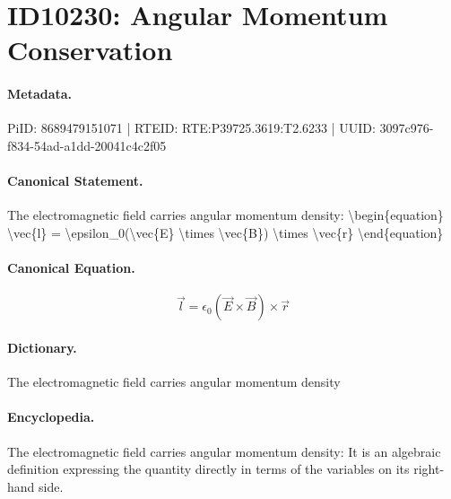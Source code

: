 \section*{ID10230: Angular Momentum Conservation}
\paragraph{Metadata.}
PiID: 8689479151071 | RTEID: RTE:P39725.3619:T2.6233 | UUID: 3097c976-f834-54ad-a1dd-20041c4c2f05

\paragraph{Canonical Statement.}
The electromagnetic field carries angular momentum density: \textbackslash{}begin\{equation\} \textbackslash{}vec\{l\} = \textbackslash{}epsilon\_0(\textbackslash{}vec\{E\} \textbackslash{}times \textbackslash{}vec\{B\}) \textbackslash{}times \textbackslash{}vec\{r\} \textbackslash{}end\{equation\}

\paragraph{Canonical Equation.}
\[
\vec{l} = \epsilon_0(\vec{E} \times \vec{B}) \times \vec{r}
\]

\paragraph{Dictionary.}
The electromagnetic field carries angular momentum density

\paragraph{Encyclopedia.}
The electromagnetic field carries angular momentum density: It is an algebraic definition expressing the quantity directly in terms of the variables on its right-hand side.
